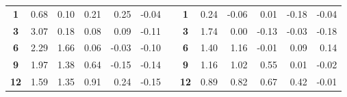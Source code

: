 \documentclass{article}
\begin{document}
\begin{table}[htbp]
\begin{tabular}{crrrrrrcrrrrr}
\cmidrule{2-13}    \textbf{1} & 0.68  & 0.10  & 0.21  & 0.25  & -0.04 &       & \textbf{1} & 0.24  & -0.06 & 0.01  & -0.18 & -0.04 \\
    \textbf{3} & 3.07  & 0.18  & 0.08  & 0.09  & -0.11 &       & \textbf{3} & 1.74  & 0.00  & -0.13 & -0.03 & -0.18 \\
    \textbf{6} & 2.29  & 1.66  & 0.06  & -0.03 & -0.10 &       & \textbf{6} & 1.40  & 1.16  & -0.01 & 0.09  & 0.14 \\
    \textbf{9} & 1.97  & 1.38  & 0.64  & -0.15 & -0.14 &       & \textbf{9} & 1.16  & 1.02  & 0.55  & 0.01  & -0.02 \\
    \textbf{12} & 1.59  & 1.35  & 0.91  & 0.24  & -0.15 &       & \textbf{12} & 0.89  & 0.82  & 0.67  & 0.42  & -0.01 \\
    \bottomrule
    \end{tabular}%
  \label{tab:addlabel}%
\end{table}%
\end{document}
